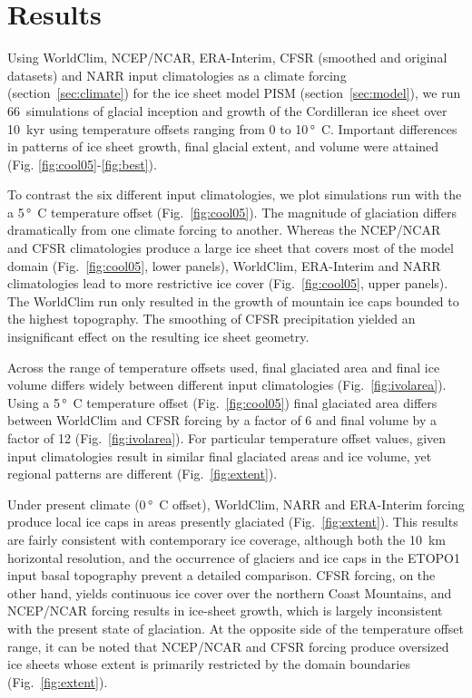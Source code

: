 \section{Results}
\label{sec:results}

Using WorldClim, NCEP/NCAR, ERA-Interim, CFSR (smoothed and original datasets) and NARR input climatologies as a climate forcing (section~\ref{sec:climate}) for the ice sheet model PISM (section~\ref{sec:model}), we run 66~simulations of glacial inception and growth of the Cordilleran ice sheet over 10~kyr using temperature offsets ranging from 0 to 10\,\unit{\degree C}. Important differences in patterns of ice sheet growth, final glacial extent, and volume were attained (Fig. \ref{fig:cool05}-\ref{fig:best}).

To contrast the six different input climatologies, we plot simulations run with the a 5\,\unit{\degree C} temperature offset (Fig.~\ref{fig:cool05}). The magnitude of glaciation differs dramatically from one climate forcing to another. Whereas the NCEP/NCAR and CFSR climatologies produce a large ice sheet that covers most of the model domain (Fig.~\ref{fig:cool05}, lower panels), WorldClim, ERA-Interim and NARR climatologies lead to more restrictive ice cover (Fig.~\ref{fig:cool05}, upper panels). The WorldClim run only resulted in the growth of mountain ice caps bounded to the highest topography. The smoothing of CFSR precipitation yielded an insignificant effect on the resulting ice sheet geometry.

Across the range of temperature offsets used, final glaciated area and final ice volume differs widely between different input climatologies (Fig.~\ref{fig:ivolarea}). Using a 5\,\unit{\degree C} temperature offset (Fig.~\ref{fig:cool05}) final glaciated area differs between WorldClim and CFSR forcing by a factor of 6 and final volume by a factor of 12 (Fig.~\ref{fig:ivolarea}). For particular temperature offset values, given input climatologies result in similar final glaciated areas and ice volume, yet regional patterns are different (Fig.~\ref{fig:extent}).

Under present climate (0\,\unit{\degree C} offset), WorldClim, NARR and ERA-Interim forcing produce local ice caps in areas presently glaciated (Fig.~\ref{fig:extent}). This results are fairly consistent with contemporary ice coverage, although both the 10~km horizontal resolution, and the occurrence of glaciers and ice caps in the ETOPO1 input basal topography prevent a detailed comparison. CFSR forcing, on the other hand, yields continuous ice cover over the northern Coast Mountains, and NCEP/NCAR forcing results in ice-sheet growth, which is largely inconsistent with the present state of glaciation. At the opposite side of the temperature offset range, it can be noted that NCEP/NCAR and CFSR forcing produce oversized ice sheets whose extent is primarily restricted by the domain boundaries (Fig.~\ref{fig:extent}).

